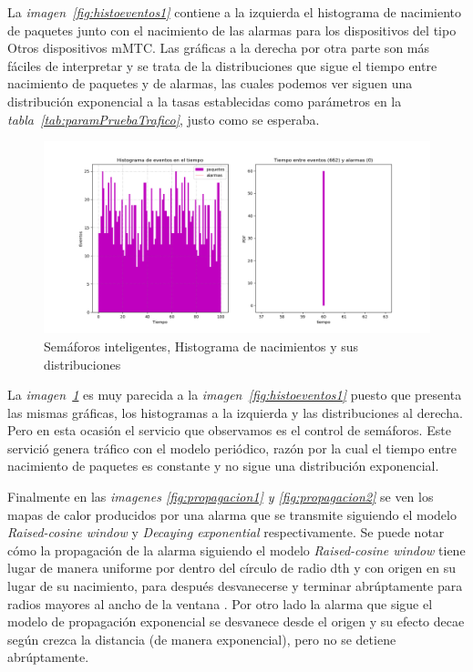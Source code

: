 La \textit{imagen~\ref{fig:histoeventos1}} contiene a la izquierda el histograma de  nacimiento de paquetes junto con el nacimiento de las alarmas para los dispositivos  del tipo Otros dispositivos mMTC. Las gráficas a la derecha por otra parte son más fáciles de interpretar y se trata de la distribuciones que sigue el tiempo entre nacimiento de paquetes y de alarmas, las cuales podemos ver  siguen una distribución exponencial a la tasas establecidas como parámetros en la  \textit{tabla~\ref{tab:paramPruebaTrafico}}, justo como se esperaba.\newline

\begin{figure}[th]
    \centering
    \includegraphics[scale=.55]{Figures/Semaforos_inteligentes.png}
    \decoRule
    \caption[Semáforos inteligentes, Histograma de nacimientos y sus distribuciones]{Semáforos inteligentes, Histograma de nacimientos y sus distribuciones}
    \label{fig:histoeventos2}
\end{figure}

La \textit{imagen~\ref{fig:histoeventos2}} es muy parecida a la \textit{imagen~\ref{fig:histoeventos1}} puesto que presenta las mismas gráficas, los histogramas a la izquierda y las distribuciones al derecha.  Pero en esta ocasión el servicio que observamos es el control de semáforos. Este servició genera  tráfico con el modelo periódico, razón por la cual el tiempo entre nacimiento de paquetes  es constante y no sigue una distribución exponencial.\newline

Finalmente en las \textit{imagenes \ref{fig:propagacion1} y \ref{fig:propagacion2}} se ven los mapas de calor producidos por una alarma que se transmite siguiendo el modelo \textit{Raised-cosine window} y \textit{Decaying exponential} respectivamente. Se puede notar cómo la propagación de la alarma siguiendo el modelo \textit{Raised-cosine window} tiene lugar de manera uniforme por dentro del círculo de radio dth  y con origen en su lugar de su nacimiento, para después desvanecerse y terminar abrúptamente para radios mayores al ancho de la ventana . Por otro lado la alarma que sigue el modelo de propagación exponencial se desvanece desde el origen y su efecto decae según crezca la distancia (de manera exponencial), pero no se detiene abrúptamente.\newline

